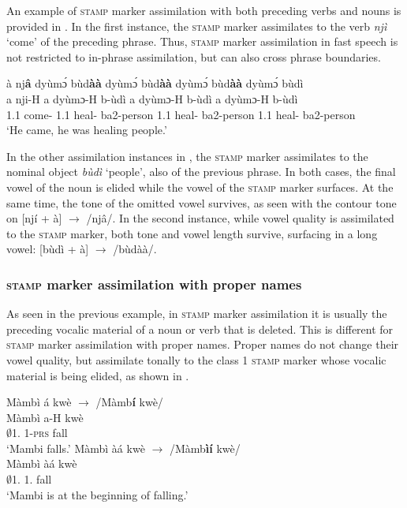 An example of \textsc{stamp} marker assimilation with both preceding verbs and nouns is provided in . In the first instance, the \textsc{stamp} marker assimilates to the verb {\itshape njì} `come' of the preceding phrase. Thus, \textsc{stamp} marker assimilation in fast speech is not restricted to in-phrase assimilation, but can also cross phrase boundaries.

\ea \label{SCOPAs1}
  \glll  à nj{\bfseries â} dyùmɔ́ bùd{\bfseries àà} dyùmɔ́ bùd{\bfseries àà} dyùmɔ́ bùd{\bfseries àà} dyùmɔ́ bùdì  \\
           a nji-H a dyùmɔ-H b-ùdì a dyùmɔ-H  b-ùdì a dyùmɔ-H b-ùdì   \\
          1.{\PST}1 come-{\R} 1.{\PST}1 heal-{\R} ba2-person 1.{\PST}1 heal-{\R} ba2-person 1.{\PST}1 heal-{\R} ba2-person  \\
    \trans `He came, he was healing people.'
\z

\noindent In the other assimilation instances in , the \textsc{stamp} marker assimilates to the nominal object {\itshape bùdì} `people', also of the previous phrase. In both cases, the final vowel of the noun is elided while the vowel of the \textsc{stamp} marker surfaces. At the same time, the tone of the omitted vowel survives, as seen with the contour tone on [njí + à]  $\rightarrow$ /njâ/. In the second instance, while vowel quality is assimilated to the \textsc{stamp} marker, both tone and vowel length survive, surfacing in a long vowel: [bùdì + à] $\rightarrow$ /bùdàà/.

\subsubsection*{\textsc{stamp} marker assimilation with proper names}
As seen in the previous example, in \textsc{stamp} marker assimilation it is usually the preceding vocalic material of a noun or verb that is deleted. This is different for \textsc{stamp} marker assimilation with proper names. Proper names do not change their vowel quality, but assimilate tonally to the class 1 \textsc{stamp} marker whose vocalic material is being elided, as shown in .

\ea \label{SCOPAs2}
  \ea \label{SCOPAs2a}
\glll Màmbì á kwè   $\rightarrow$ /Màmb{\bfseries í} kwè/ \\ 
      Màmbì a-H kwè \\
	$\emptyset$1.{\PN} 1-\textsc{prs} fall\\
	\trans `Mambi falls.'
\ex \label{SCOPAs2b}
  \glll Màmbì àá kwè  $\rightarrow$ /Màmb{\bfseries ìí} kwè/ \\
        Màmbì àá kwè \\
          $\emptyset$1.{\PN} 1.{\INCH} fall    \\
    \trans `Mambi is at the beginning of falling.'
\z
\z

